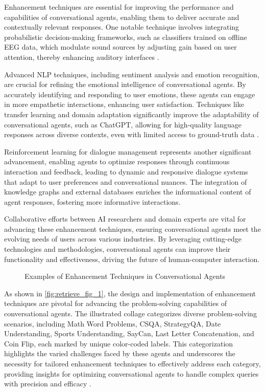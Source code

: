 Enhancement techniques are essential for improving the performance and capabilities of conversational agents, enabling them to deliver accurate and contextually relevant responses. One notable technique involves integrating probabilistic decision-making frameworks, such as classifiers trained on offline EEG data, which modulate sound sources by adjusting gain based on user attention, thereby enhancing auditory interfaces \cite{haghighi2017eegassistedmodulationsoundsources}.

Advanced NLP techniques, including sentiment analysis and emotion recognition, are crucial for refining the emotional intelligence of conversational agents. By accurately identifying and responding to user emotions, these agents can engage in more empathetic interactions, enhancing user satisfaction. Techniques like transfer learning and domain adaptation significantly improve the adaptability of conversational agents, such as ChatGPT, allowing for high-quality language responses across diverse contexts, even with limited access to ground-truth data \cite{park2023domainadaptationbasedhuman}.

Reinforcement learning for dialogue management represents another significant advancement, enabling agents to optimize responses through continuous interaction and feedback, leading to dynamic and responsive dialogue systems that adapt to user preferences and conversational nuances. The integration of knowledge graphs and external databases enriches the informational content of agent responses, fostering more informative interactions.

Collaborative efforts between AI researchers and domain experts are vital for advancing these enhancement techniques, ensuring conversational agents meet the evolving needs of users across various industries. By leveraging cutting-edge technologies and methodologies, conversational agents can improve their functionality and effectiveness, driving the future of human-computer interaction.

{
\begin{figure}[ht!]
\centering
{}\hspace{0.03\textwidth}
\caption{Examples of Enhancement Techniques in Conversational Agents}\label{fig:retrieve_fig_1}
\end{figure}
}

As shown in \autoref{fig:retrieve_fig_1}, the design and implementation of enhancement techniques are pivotal for advancing the problem-solving capabilities of conversational agents. The illustrated collage categorizes diverse problem-solving scenarios, including Math Word Problems, CSQA, StrategyQA, Date Understanding, Sports Understanding, SayCan, Last Letter Concatenation, and Coin Flip, each marked by unique color-coded labels. This categorization highlights the varied challenges faced by these agents and underscores the necessity for tailored enhancement techniques to effectively address each category, providing insights for optimizing conversational agents to handle complex queries with precision and efficacy \cite{wei2022chain}.

